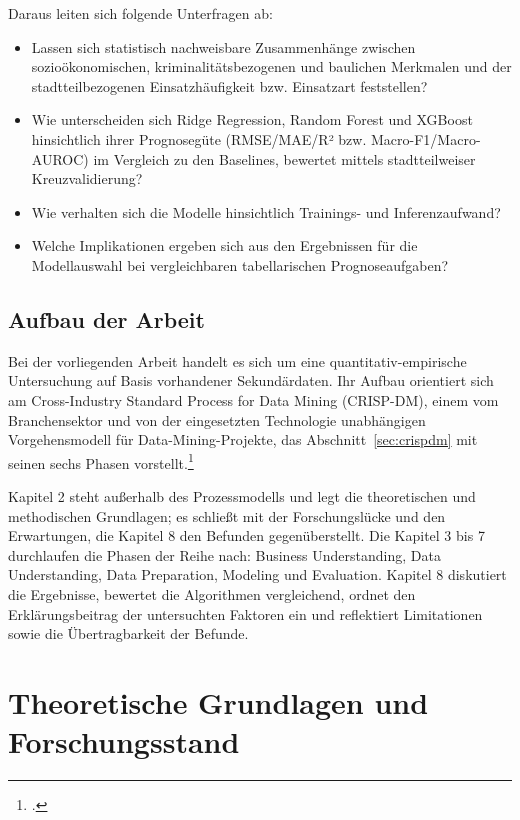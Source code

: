 \documentclass[12pt,a4paper]{article}
\begin{document}
Daraus leiten sich folgende Unterfragen ab:

\begin{itemize}[leftmargin=*, itemsep=2pt]
  \item Lassen sich statistisch nachweisbare Zusammenhänge zwischen sozioökonomischen,
        kriminalitätsbezogenen und baulichen Merkmalen und der stadtteilbezogenen
        Einsatzhäufigkeit bzw. Einsatzart feststellen?
  \item Wie unterscheiden sich Ridge Regression, Random Forest und XGBoost hinsichtlich ihrer
        Prognosegüte (RMSE/MAE/R² bzw. Macro-F1/Macro-AUROC) im Vergleich zu den Baselines,
        bewertet mittels stadtteilweiser Kreuzvalidierung?
  \item Wie verhalten sich die Modelle hinsichtlich Trainings- und Inferenzaufwand?
  \item Welche Implikationen ergeben sich aus den Ergebnissen für die Modellauswahl bei
        vergleichbaren tabellarischen Prognoseaufgaben?
\end{itemize}

\subsection{Aufbau der Arbeit}
%
Bei der vorliegenden Arbeit handelt es sich um eine quantitativ-empirische Untersuchung auf Basis
vorhandener Sekundärdaten. Ihr Aufbau orientiert sich am Cross-Industry Standard Process for Data
Mining (CRISP-DM), einem vom Branchensektor und von der eingesetzten Technologie unabhängigen
Vorgehensmodell für Data-Mining-Projekte, das Abschnitt~\ref{sec:crispdm} mit seinen sechs Phasen
vorstellt.\footcite[3, 13]{Chapman2000}

Kapitel 2 steht außerhalb des Prozessmodells und legt die theoretischen und methodischen
Grundlagen; es schließt mit der Forschungslücke und den Erwartungen, die Kapitel 8 den Befunden
gegenüberstellt. Die Kapitel 3 bis 7 durchlaufen die Phasen der Reihe nach: Business
Understanding, Data Understanding, Data Preparation, Modeling und Evaluation. Kapitel 8 diskutiert die Ergebnisse, bewertet die Algorithmen
vergleichend, ordnet den Erklärungsbeitrag der untersuchten Faktoren ein und reflektiert
Limitationen sowie die Übertragbarkeit der Befunde.

\section{Theoretische Grundlagen und Forschungsstand}
\end{document}
